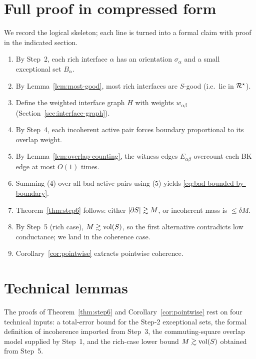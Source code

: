 \section{Full proof in compressed form}

We record the logical skeleton; each line is turned into a formal claim
with proof in the indicated section.

\begin{enumerate}[nosep]
  \item By Step~2, each rich interface $\alpha$ has an orientation
  $\sigma_\alpha$ and a small exceptional set $B_\alpha$.
  \item By Lemma~\ref{lem:most-good}, most rich interfaces are $S$-good
  (i.e.\ lie in $\mathcal{R}^\star$).
  \item Define the weighted interface graph $H$ with weights
  $w_{\alpha\beta}$ (Section~\ref{sec:interface-graph}).
  \item By Step~4, each incoherent active pair forces boundary
  proportional to its overlap weight.
  \item By Lemma~\ref{lem:overlap-counting}, the witness edges
  $E_{\alpha\beta}$ overcount each BK edge at most $O(1)$ times.
  \item Summing (4) over all bad active pairs using (5) yields
  \eqref{eq:bad-bounded-by-boundary}.
  \item Theorem~\ref{thm:step6} follows: either $|\partial S|\gtrsim M$, or
  incoherent mass is $\le\delta M$.
  \item By Step~5 (rich case), $M\gtrsim\operatorname{vol}(S)$, so the first
  alternative contradicts low conductance; we land in the coherence
  case.
  \item Corollary~\ref{cor:pointwise} extracts pointwise coherence.
\end{enumerate}

\section{Technical lemmas}

The proofs of Theorem~\ref{thm:step6} and Corollary~\ref{cor:pointwise}
rest on four technical inputs: a total-error bound for the Step-2
exceptional sets, the formal definition of incoherence imported from
Step~3, the commuting-square overlap model supplied by Step~1, and the
rich-case lower bound $M\gtrsim\operatorname{vol}(S)$ obtained from Step~5.

